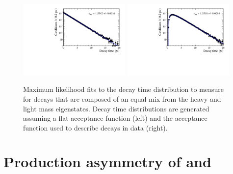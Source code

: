 \begin{figure}[tbp]
  \centering
    \includegraphics[width=0.49\textwidth]{./Figs/LifetimeSystematics/No_acc_fit.pdf}
    \includegraphics[width=0.49\textwidth]{./Figs/LifetimeSystematics/Acc_fit.pdf}
  \caption{Maximum likelihood fits to the decay time distribution to measure \tmumu for \bsmumu decays that are composed of an equal mix from the heavy and light mass eigenstates. Decay time distributions are generated assuming a flat acceptance function (left) and the acceptance function used to describe \bsmumu decays in data (right).}
  \label{fig:mixofstates}
\end{figure}


\section[Production asymmetry of \bs and $\overline{B}_{s}^{0}$]{Production asymmetry of \boldmath{\bs} and }
\label{sec:productionasymetry}



